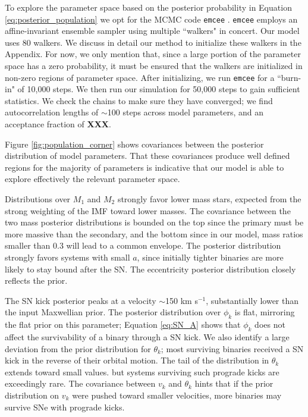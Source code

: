 \documentclass[12pt, preprint]{aastex}
\begin{document}
To explore the parameter space based on the posterior probability in Equation \ref{eq:posterior_population} we opt for the MCMC code {\tt emcee} \citep{foreman-mackey13}. {\tt emcee} employs an affine-invariant ensemble sampler using multiple ``walkers" in concert\citep{goodman10}. Our model uses 80 walkers. We discuss in detail our method to initialize these walkers in the Appendix. For now, we only mention that, since a large portion of the parameter space has a zero probability, it must be ensured that the walkers are initialized in non-zero regions of parameter space. After initializing, we run {\tt emcee} for a ``burn-in" of 10,000 steps. We then run our simulation for 50,000 steps to gain sufficient statistics. We check the chains to make sure they have converged; we find autocorrelation lengths of $\sim$100 steps across model parameters, and an acceptance fraction of {\bf XXX}. 

Figure \ref{fig:population_corner} shows covariances between the posterior distribution of model parameters. That these covariances produce well defined regions for the majority of parameters is indicative that our model is able to explore effectively the relevant parameter space. 

Distributions over $M_1$ and $M_2$ strongly favor lower mass stars, expected from the strong weighting of the IMF toward lower masses. The covariance between the two mass posterior distributions is bounded on the top since the primary must be more massive than the secondary, and the bottom since in our model, mass ratios smaller than 0.3 will lead to a common envelope. The posterior distribution strongly favors systems with small $a$, since initially tighter binaries are more likely to stay bound after the SN. The eccentricity posterior distribution closely reflects the prior. 

The SN kick posterior peaks at a velocity $\sim$150 km s$^{-1}$, substantially lower than the input Maxwellian prior. The posterior distribution over $\phi_k$ is flat, mirroring the flat prior on this parameter; Equation \ref{eq:SN_A} shows that $\phi_k$ does not affect the survivability of a binary through a SN kick. We also identify a large deviation from the prior distribution for $\theta_k$; most surviving binaries received a SN kick in the reverse of their orbital motion. The tail of the distribution in $\theta_k$ extends toward small values. but systems surviving such prograde kicks are exceedingly rare. The covariance between $v_k$ and $\theta_k$ hints that if the prior distribution on $v_k$ were pushed toward smaller velocities, more binaries may survive SNe with prograde kicks. 
\end{document}
